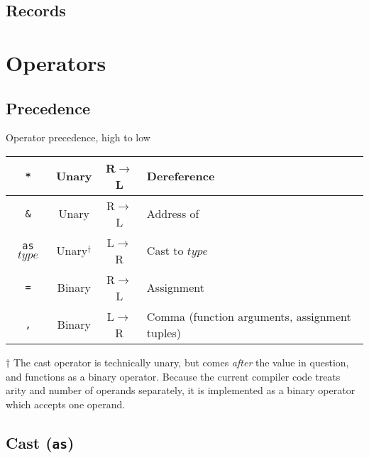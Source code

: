 \documentclass{article}
\begin{document}
\subsection{Records}
\label{sub:types:record}

\section{Operators}
\label{sec:operators}

\subsection{Precedence}
\label{sub:operators:precedence}
\begin{center}
  \begin{threeparttable}
    \caption{Operator precedence, high to low}
    \begin{tabular}{|c|c|c|l|}
      \hline
      \texttt{*} & Unary & R$\to$L & Dereference \\ \hline
      \texttt{\&} & Unary & R$\to$L & Address of \\ \hline
      \texttt{as} $type$ & Unary$^\dagger$ & L$\to$R & Cast to $type$ \\ \hline
      \texttt{=} & Binary & R$\to$L & Assignment \\ \hline
      \texttt{,} & Binary & L$\to$R & Comma (function arguments, assignment tuples) \\ \hline
    \end{tabular}
    \begin{tablenotes}
      \item{$\dagger$ \small{The cast operator is technically unary, but comes
          \emph{after}
          the value in question, and functions as a binary operator. Because the current
          compiler code treats arity and number of operands separately, it is implemented
          as a binary operator which accepts one operand.}}
    \end{tablenotes}
  \end{threeparttable}
\end{center}

\subsection{Cast (\texttt{as})}
\label{sub:operators:cast}
\end{document}
